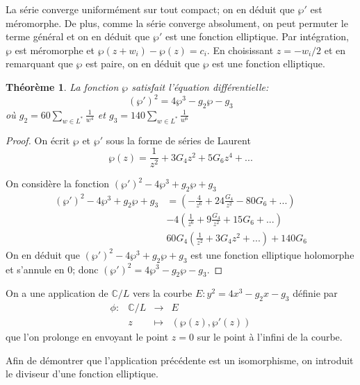 \documentclass{article}
\newtheorem{theoreme}{Théorème}
\begin{document}
La série converge uniformément sur tout compact; on en déduit que $\wp'$ est méromorphe.
De plus, comme la série converge absolument, on peut permuter le terme général et on en
déduit que $\wp'$ est une fonction elliptique. Par intégration, $\wp$ est méromorphe et $\wp(z+w_{i})-\wp(z)=c_{i}$.
En choisissant $z=-w_{i}/2$ et en remarquant que $\wp$ est paire, on en déduit que $\wp$ est une fonction elliptique.

\begin{theoreme}
La fonction $\wp$ satisfait l'équation différentielle:
\begin{equation*}
(\wp')^2 = 4\wp^3 - g_{2}\wp - g_{3}
\end{equation*}
où $g_{2} = 60\sum_{w\in L^{*}}{\frac{1}{w^4}}$ et $g_{3} = 140\sum_{w\in L^{*}}{\frac{1}{w^6}}$
\end{theoreme}

\begin{proof}
On écrit $\wp$ et $\wp'$ sous la forme de séries de Laurent
\begin{equation*}
\wp(z) = \frac{1}{z^2} + 3G_{4}z^2 + 5G_{6}z^4 + ...
\end{equation*}

On considère la fonction $(\wp')^2 - 4\wp^3 + g_{2}\wp + g_{3}$
\begin{align*}
(\wp')^2 - 4\wp^3 + g_{2}\wp + g_{3} &= (-\frac{4}{z^6} + 24\frac{G_{4}}{z^2} - 80G_{6} + ...) \\
									 & - 4(\frac{1}{z^6} + 9\frac{G_{4}}{z^2} + 15G_{6} + ...) \\
									 & 60G_{4}(\frac{1}{z^2} + 3G_{4}z^2 + ...) + 140G_{6}
\end{align*}
On en déduit que $(\wp')^2 - 4\wp^3 + g_{2}\wp + g_{3}$ est une fonction elliptique holomorphe et s'annule en $0$; donc $(\wp')^2 = 4\wp^3 - g_{2}\wp - g_{3}$.
\end{proof}

On a une application de $\mathbb{C}/L$ vers la courbe $E: y^2 = 4x^3 - g_{2}x - g_{3}$ définie par
\begin{equation*}
\begin{array}{lrcl}
\phi :&\mathbb{C}/L & \longrightarrow & E \\
	 & z & \longmapsto & (\wp(z), \wp'(z))
\end{array}
\end{equation*}
que l'on prolonge en envoyant le point $z=0$ sur le point à l'infini de la courbe.

Afin de démontrer que l'application précédente est un isomorphisme, on introduit le diviseur d'une fonction elliptique.
\end{document}
